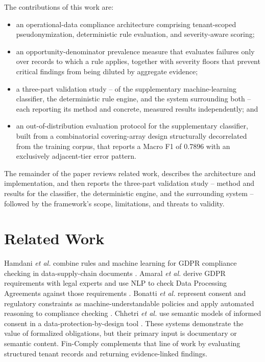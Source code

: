 \documentclass[11pt,a4paper]{article}
\newcommand{\system}{Fin-Comply}
\begin{document}
The contributions of this work are:
\begin{itemize}
    \item an operational-data compliance architecture comprising tenant-scoped pseudonymization, deterministic rule evaluation, and severity-aware scoring;
    \item an opportunity-denominator prevalence measure that evaluates failures only over records to which a rule applies, together with severity floors that prevent critical findings from being diluted by aggregate evidence;
    \item a three-part validation study -- of the supplementary machine-learning classifier, the deterministic rule engine, and the system surrounding both -- each reporting its method and concrete, measured results independently; and
    \item an out-of-distribution evaluation protocol for the supplementary classifier, built from a combinatorial covering-array design structurally decorrelated from the training corpus, that reports a Macro F1 of 0.7896 with an exclusively adjacent-tier error pattern.
\end{itemize}

The remainder of the paper reviews related work, describes the architecture and implementation, and then reports the three-part validation study -- method and results for the classifier, the deterministic engine, and the surrounding system -- followed by the framework's scope, limitations, and threats to validity.

\section{Related Work}
Hamdani \emph{et al.} combine rules and machine learning for GDPR compliance checking in data-supply-chain documents \cite{hamdani}. Amaral \emph{et al.} derive GDPR requirements with legal experts and use NLP to check Data Processing Agreements against those requirements \cite{amaral}. Bonatti \emph{et al.} represent consent and regulatory constraints as machine-understandable policies and apply automated reasoning to compliance checking \cite{bonatti}. Chhetri \emph{et al.} use semantic models of informed consent in a data-protection-by-design tool \cite{chhetri}. These systems demonstrate the value of formalized obligations, but their primary input is documentary or semantic content. \system{} complements that line of work by evaluating structured tenant records and returning evidence-linked findings.
\end{document}
